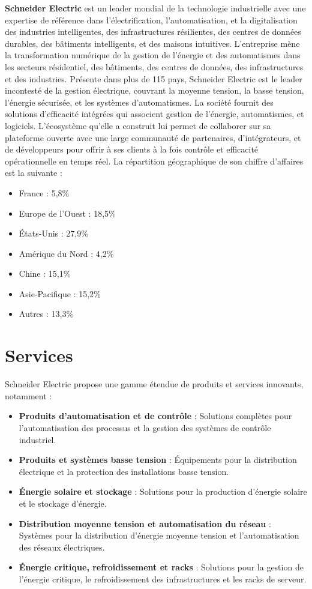 \textbf{Schneider Electric} est un leader mondial de la technologie industrielle avec une expertise de référence dans l'électrification, l'automatisation, et la digitalisation des industries intelligentes, des infrastructures résilientes, des centres de données durables, des bâtiments intelligents, et des maisons intuitives. L'entreprise mène la transformation numérique de la gestion de l'énergie et des automatismes dans les secteurs résidentiel, des bâtiments, des centres de données, des infrastructures et des industries.
Présente dans plus de 115 pays, Schneider Electric est le leader incontesté de la gestion électrique, couvrant la moyenne tension, la basse tension, l'énergie sécurisée, et les systèmes d'automatismes. La société fournit des solutions d'efficacité intégrées qui associent gestion de l'énergie, automatismes, et logiciels. L'écosystème qu'elle a construit lui permet de collaborer sur sa plateforme ouverte avec une large communauté de partenaires, d'intégrateurs, et de développeurs pour offrir à ses clients à la fois contrôle et efficacité opérationnelle en temps réel.
La répartition géographique de son chiffre d'affaires est la suivante :

\begin{itemize}
  \item France : 5,8\%
  \item Europe de l'Ouest : 18,5\%
  \item États-Unis : 27,9\%
  \item Amérique du Nord : 4,2\%
  \item Chine : 15,1\%
  \item Asie-Pacifique : 15,2\%
  \item Autres : 13,3\%
\end{itemize}


\section{Services}

Schneider Electric propose une gamme étendue de produits et services innovants, notamment :
\begin{itemize}
    \item \textbf{Produits d'automatisation et de contrôle} : Solutions complètes pour l'automatisation des processus et la gestion des systèmes de contrôle industriel.
    \item \textbf{Produits et systèmes basse tension} : Équipements pour la distribution électrique et la protection des installations basse tension.
    \item \textbf{Énergie solaire et stockage} : Solutions pour la production d'énergie solaire et le stockage d'énergie.
    \item \textbf{Distribution moyenne tension et automatisation du réseau} : Systèmes pour la distribution d'énergie moyenne tension et l'automatisation des réseaux électriques.
    \item \textbf{Énergie critique, refroidissement et racks} : Solutions pour la gestion de l'énergie critique, le refroidissement des infrastructures et les racks de serveur.
\end{itemize}


